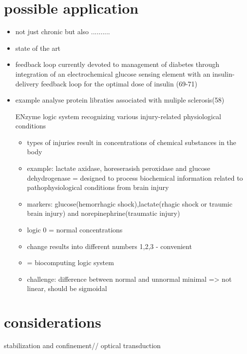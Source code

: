 \documentclass[runningheads]{llncs}
\begin{document}
\section{possible application}
	\begin{itemize}
		\item not just chronic but also ..........
		\item state of the art
		\item feedback loop currently devoted to management of diabetes through integration of an electrochemical glucose sensing element with an insulin-delivery feedback loop for the optimal dose of insulin (69-71)
		\item example analyse protein libraties associated with muliple sclerosis(58)
		
		ENzyme logic system recognizing various injury-related physiological conditions
		\begin{itemize}
			\item types of injuries result in concentrations of chemical substances in the body
			\\	
			\item example: lactate axidase, horeserasish peroxidase and glucose dehydrogenase = designed to process biochemical information related to pathophysiological conditions from brain injury
			\item markers: glucose(hemorrhagic shock),lactate(rhagic shock or traumic brain injury) and norepinephrine(traumatic injury)
			\item logic 0 = normal concentrations
			\item change results into different numbers 1,2,3 - convenient
			\item = biocomputing logic system 
			\item challenge: difference between normal and unnormal minimal => not linear, should be sigmoidal	
		\end{itemize}
	\end{itemize}



\section{considerations}
stabilization and confinement//
optical transduction 
\end{document}
